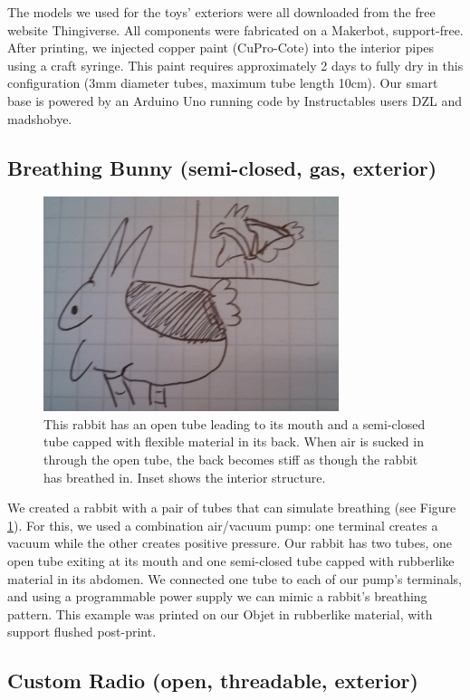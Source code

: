 The models we used for the toys' exteriors were all downloaded from the free website Thingiverse.  All components were fabricated on a Makerbot, support-free.  After printing, we injected copper paint (CuPro-Cote) into the interior pipes using a craft syringe.  This paint requires approximately 2 days to fully dry in this configuration (3mm diameter tubes, maximum tube length 10cm).  Our smart base is powered by an Arduino Uno running code by Instructables users DZL and madshobye.

\subsection{Breathing Bunny (semi-closed, gas, exterior)}

\begin{figure}[h]
\centering
    \includegraphics[width=3.4in]{figures/placeholder/bunny.jpg}
\caption{This rabbit has an open tube leading to its mouth and a semi-closed tube capped with flexible material in its back.  When air is sucked in through the open tube, the back becomes stiff as though the rabbit has breathed in.  Inset shows the interior structure.}
\label{fig:breathe}
\end{figure}

We created a rabbit with a pair of tubes that can simulate breathing (see Figure \ref{fig:breathe}).  For this, we used a combination air/vacuum pump: one terminal creates a vacuum while the other creates positive pressure.  Our rabbit has two tubes, one open tube exiting at its mouth and one semi-closed tube capped with rubberlike material in its abdomen.  We connected one tube to each of our pump's terminals, and using a programmable power supply we can mimic a rabbit's breathing pattern.  This example was printed on our Objet in rubberlike material, with support flushed post-print. 

\subsection{Custom Radio (open, threadable, exterior)}

